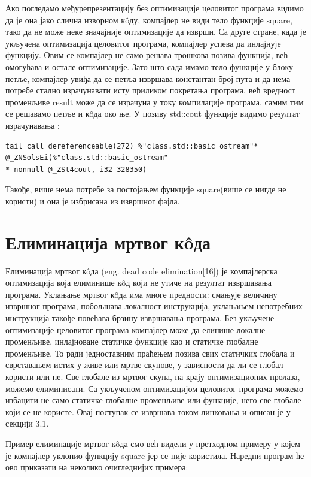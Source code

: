 \documentclass[12pt,oneside]{memoir}
\begin{document}
Ако погледамо међурепрезентацију без оптимизације целовитог програма видимо да је она јако
слична изворном к\^{o}ду, компајлер не види тело функције square, тако да не може неке 
значајније оптимизације да изврши.
Са друге стране, када је укључена оптимизација целовитог програма, компајлер
успева да инлајнује функцију.
Овим се компајлер не само решава трошкова позива функција, већ омогућава и остале оптимизације.
Зато што сада имамо тело функције у блоку петље, компајлер увиђа да се петља извршава константан
број пута и да нема потребе стално израчунавати исту приликом покретања програма, већ вредност
променљиве result може да се израчуна у току компилације програма, самим тим се решавамо петље и к\^{o}да око ње.
У позиву std::cout функције видимо резултат израчунавања :
\begin{lstlisting}[frame=single]
tail call dereferenceable(272) %"class.std::basic_ostream"*
@_ZNSolsEi(%"class.std::basic_ostream"
* nonnull @_ZSt4cout, i32 328350)
\end{lstlisting}
Такође, више нема потребе за постојањем функције square(више се нигде не користи)
и она је избрисана из извршног фајла.



\section{Елиминација мртвог к\^{o}да}

Елиминација мртвог к\^{o}да (eng. dead code elimination[16]) је компајлерска 
оптимизација која елиминише к\^{o}д који не утиче на резултат извршавања
програма.
Уклањање мртвог к\^{o}да има многе предности: смањује величину извршног програма,
побољшава локалност инструкција, уклањањем непотребних инструкција такође
повећава брзину извршавања програма.
Без укључене оптимизације целовитог програма компајлер може да елинише локалне
променљиве, инлајноване статичке функције као и статичке глобалне променљиве.
То ради једноставним праћењем позива свих статичких глобала и сврставањем истих
у живе или мртве скупове, у зависности да ли се глобал користи или не.
Све глобале из мртвог скупа, на крају оптимизационих пролаза, можемо елиминисати.
Са укљученом оптимизацијом целовитог програма можемо избацити не само статичке
глобалне променљиве или функције, него све глобале који се не користе.
Овај поступак се извршава током линковања и описан је у секцији  3.1.

Пример елиминације мртвог к\^{o}да смо већ видели у претходном примеру
у којем је компајлер уклонио функцију square јер се није користила. Наредни
програм ће ово приказати на неколико очигледнијих примера:
\end{document}
